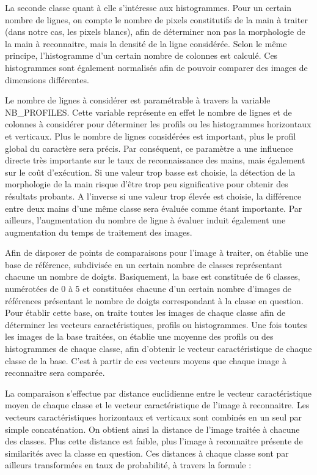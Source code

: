 La seconde classe quant à elle s'intéresse aux histogrammes. Pour un certain nombre de lignes, on compte le nombre de pixels constitutifs de la main à traiter (dans notre cas, les pixels blancs), afin de déterminer non pas la morphologie de la main à reconnaitre, mais la densité de la ligne considérée. Selon le même principe, l'histogramme d'un certain nombre de colonnes est calculé. Ces histogrammes sont également normalisés afin de pouvoir comparer des images de dimensions différentes.

Le nombre de lignes à considérer est paramétrable à travers la variable NB\_PROFILES. Cette variable représente en effet le nombre de lignes et de colonnes à considérer pour déterminer les profils ou les histogrammes horizontaux et verticaux. Plus le nombre de lignes considérées est important, plus le profil global du caractère sera précis. Par conséquent, ce paramètre a une influence directe très importante sur le taux de reconnaissance des mains, mais également sur le coût d’exécution. Si une valeur trop basse est choisie, la détection de la morphologie de la main risque d’être trop peu significative pour obtenir des résultats probants. A l’inverse si une valeur trop élevée est choisie, la différence entre deux mains d’une même classe sera évaluée comme étant importante. Par ailleurs, l'augmentation du nombre de ligne à évaluer induit également une augmentation du temps de traitement des images.

	Afin de disposer de points de comparaisons pour l'image à traiter, on établie une base de référence, subdivisée en un certain nombre de classes représentant chacune un nombre de doigts. Basiquement, la base est constituée de 6 classes, numérotées de 0 à 5 et constituées chacune d'un certain nombre d'images de références présentant le nombre de doigts correspondant à la classe en question. Pour établir cette base, on traite toutes les images de chaque classe afin de déterminer les vecteurs caractéristiques, profils ou histogrammes. Une fois toutes les images de la base traitées, on établie une moyenne des profils ou des histogrammes de chaque classe, afin d'obtenir le vecteur caractéristique de chaque classe de la base. C'est à partir de ces vecteurs moyens que chaque image à reconnaitre sera comparée. 	

	La comparaison s'effectue par distance euclidienne entre le vecteur caractéristique moyen de chaque classe et le vecteur caractéristique de l'image à reconnaitre. Les vecteurs caractéristiques horizontaux et verticaux sont combinés en un seul par simple concaténation. On obtient ainsi la distance de l'image traitée à chacune des classes. Plus cette distance est faible, plus l'image à reconnaitre présente de similarités avec la classe en question. Ces distances à chaque classe sont par ailleurs transformées en taux de probabilité, à travers la formule :

